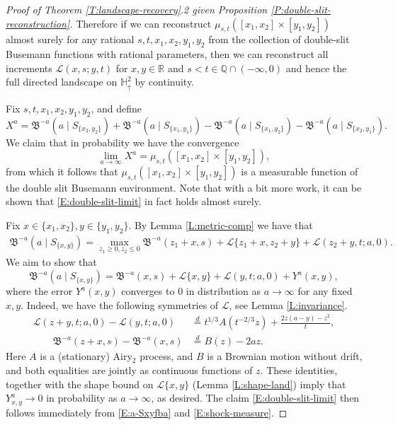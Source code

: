 \documentclass[11pt]{article}
\newcommand{\Q}{\mathbb{Q}}
\newcommand{\R}{\mathbb{R}}
\newcommand{\cL}{\mathcal{L}}
\newcommand{\fB}{\mathfrak{B}}
\newcommand{\eqd}{\stackrel{d}{=}}
\newcommand{\X}{\times}
\theoremstyle{definition} %
\theoremstyle{remark} %
\begin{document}
\begin{proof}[Proof of Theorem \ref{T:landscape-recovery}.2 given Proposition \ref{P:double-slit-reconstruction}]
	Therefore if we can reconstruct $\mu_{s, t}([x_1, x_2] \X [y_1, y_2])$ almost surely for any rational $s, t, x_1, x_2, y_1, y_2$ from the collection of double-slit Busemann functions with rational parameters, then we can reconstruct all increments $\cL(x, s; y, t)$ for $x, y \in \R$ and $s < t \in \Q \cap (-\infty, 0)$  and hence the full directed landscape on $\mathbb H^2_\uparrow$ by continuity.
	
	Fix $s, t, x_1, x_2, y_1, y_2$, and define
	$$
	X^a = \fB^{-a}(a \mid S_{\{x_2, y_2\}}) + \fB^{-a}(a \mid S_{\{x_1, y_1\}}) - \fB^{-a}(a \mid S_{\{x_1, y_2\}}) - \fB^{-a}(a \mid S_{\{x_2, y_1\}}).
	$$
	We claim that in probability we have the convergence
	\begin{equation}
		\label{E:double-slit-limit}
		\lim_{a \to \infty} X^a = \mu_{s, t}([x_1, x_2] \X [y_1, y_2]),
	\end{equation}
	from which it follows that $\mu_{s, t}([x_1, x_2] \X [y_1, y_2])$ is a measurable function of the double slit Busemann environment. Note that with a bit more work, it can be shown that \eqref{E:double-slit-limit} in fact holds almost surely.
	
	Fix $x \in \{x_1, x_2\}, y \in \{y_1, y_2\}$. By Lemma \ref{L:metric-comp} we have that
	\begin{align}
		\label{E:fBa-Sxy}
		\fB^{-a}(a \mid S_{\{x, y\}}) = \max_{z_1 \ge 0, z_2 \le 0} \fB^{-a}(z_1 + x, s) + \cL\{z_1 + x, z_2 + y\} + \cL(z_2 + y, t; a, 0).
	\end{align}
	We aim to show that
	\begin{equation}
		\label{E:a-Sxyfba}
		\fB^{-a}(a \mid S_{\{x, y\}}) = \fB^{-a}(x, s) + \cL\{x, y\} + \cL(y, t; a, 0) + Y^a(x, y),
	\end{equation}
	where the error $Y^a(x, y)$ converges to $0$ in distribution as $a \to \infty$ for any fixed $x, y$. Indeed, we have the following symmetries of $\cL$, see Lemma \ref{L:invariance}.
	\begin{align*}
		\cL(z + y, t; a, 0) - \cL(y, t; a, 0) &\eqd t^{1/3} A(t^{-2/3} z) + \frac{2z(a - y) - z^2}{t}, \\
		\qquad \fB^{-a}(z + x, s) - \fB^{-a}(x, s) &\eqd B(z) - 2a z.
	\end{align*}
	Here $A$ is a (stationary) Airy$_2$ process, and $B$ is a Brownian motion without drift,
	and both equalities are jointly as continuous functions of $z$. These identities, together with the shape bound on $\cL\{x, y\}$ (Lemma \ref{L:shape-land}) imply that $Y^a_{x, y} \to 0$ in probability as $a \to \infty$, as desired. The claim \eqref{E:double-slit-limit} then follows immediately from \eqref{E:a-Sxyfba} and \eqref{E:shock-measure}.
\end{proof}
\end{document}
